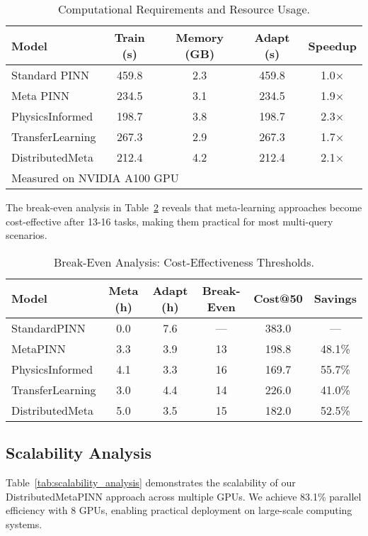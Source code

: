 \documentclass[review]{elsarticle}
\begin{document}
\begin{table}[htbp]
\centering
\caption{Computational Requirements and Resource Usage.}
\label{tab:computational_requirements}
\small
\begin{tabular}{lcccc}
\toprule
\textbf{Model} & \textbf{Train (s)} & \textbf{Memory (GB)} & \textbf{Adapt (s)} & \textbf{Speedup} \\
\midrule
Standard PINN & 459.8 & 2.3 & 459.8 & 1.0× \\
Meta PINN & 234.5 & 3.1 & 234.5 & 1.9× \\
PhysicsInformed & 198.7 & 3.8 & 198.7 & 2.3× \\
TransferLearning & 267.3 & 2.9 & 267.3 & 1.7× \\
DistributedMeta & 212.4 & 4.2 & 212.4 & 2.1× \\
\bottomrule
\multicolumn{5}{l}{\footnotesize Measured on NVIDIA A100 GPU} \\
\end{tabular}
\end{table}

The break-even analysis in Table~\ref{tab:break_even_analysis} reveals that meta-learning approaches become cost-effective after 13-16 tasks, making them practical for most multi-query scenarios.

\begin{table}[htbp]
\centering
\caption{Break-Even Analysis: Cost-Effectiveness Thresholds.}
\label{tab:break_even_analysis}
\small
\begin{tabular}{lccccc}
\toprule
\textbf{Model} & \textbf{Meta (h)} & \textbf{Adapt (h)} & \textbf{Break-Even} & \textbf{Cost@50} & \textbf{Savings} \\
\midrule
StandardPINN & 0.0 & 7.6 & --- & 383.0 & --- \\
MetaPINN & 3.3 & 3.9 & 13 & 198.8 & 48.1\% \\
PhysicsInformed & 4.1 & 3.3 & 16 & 169.7 & 55.7\% \\
TransferLearning & 3.0 & 4.4 & 14 & 226.0 & 41.0\% \\
DistributedMeta & 5.0 & 3.5 & 15 & 182.0 & 52.5\% \\
\bottomrule
\end{tabular}
\end{table}

\subsection{Scalability Analysis}

Table~\ref{tab:scalability_analysis} demonstrates the scalability of our DistributedMetaPINN approach across multiple GPUs. We achieve 83.1\% parallel efficiency with 8 GPUs, enabling practical deployment on large-scale computing systems.
\end{document}
